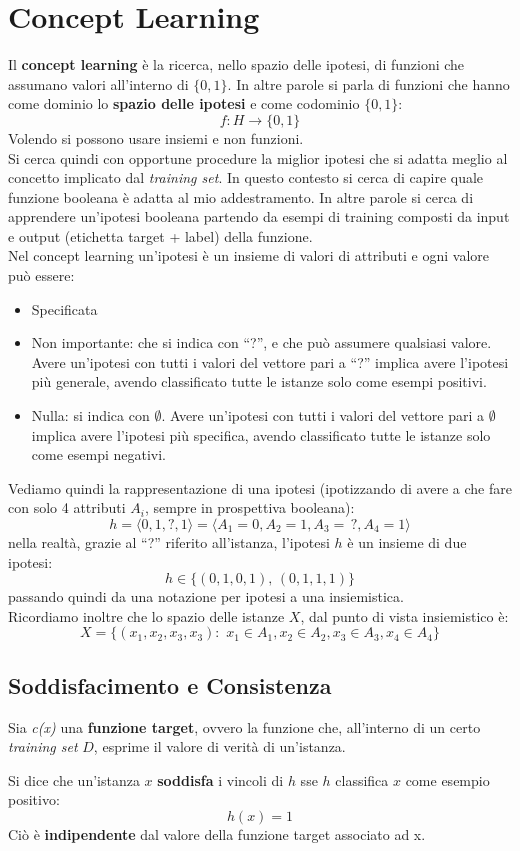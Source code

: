 \chapter{Concept Learning}
\label{Capitolo 2}
Il \textbf{concept learning} è la ricerca, nello spazio delle ipotesi, di
funzioni che assumano valori all'interno di $\{0, 1\}$. In altre parole si
parla di funzioni che hanno come dominio lo \textbf{spazio delle ipotesi} e
come codominio $\{0, 1\}$:
\[f:H\to\{0, 1\}\]
Volendo si possono usare insiemi e non funzioni.\\
Si cerca quindi con opportune procedure la miglior ipotesi che si adatta
meglio al concetto implicato dal \textit{training set}.
In questo contesto si cerca di capire quale funzione booleana è adatta al mio
addestramento. In altre parole si cerca di apprendere un'ipotesi booleana
partendo da esempi di training composti da input e output (etichetta target + label) della
funzione. \\
Nel concept learning un'ipotesi è un insieme di valori di attributi e ogni
valore può essere:
\begin{itemize}
  \item Specificata
  \item Non importante: che si indica con ``?'', e che può assumere qualsiasi
  valore. Avere un'ipotesi con tutti i valori del vettore pari a ``?'' implica
  avere l'ipotesi più generale, avendo classificato tutte le istanze solo come
  esempi positivi. 
  \item Nulla: si indica con $\emptyset$. Avere un'ipotesi con tutti i valori
  del vettore pari a $\emptyset$ implica avere l'ipotesi più specifica, avendo
  classificato tutte le istanze solo come esempi negativi. 
\end{itemize}
\begin{esempio}
  Vediamo quindi la rappresentazione di una ipotesi (ipotizzando di avere a che
  fare con solo 4 attributi $A_i$, sempre in prospettiva booleana):
  \[h=\langle 0, 1, ?, 1\rangle = \langle A_1=0, A_2=1, A_3=\,?, A_4=1\rangle\]
  nella realtà, grazie al ``?'' riferito all'istanza, l'ipotesi $h$ è un insieme
  di due ipotesi: 
  \[h\in\{(0, 1, 0, 1),\,(0, 1, 1, 1)\}\]
  passando quindi da una notazione per ipotesi a una insiemistica.\\
  Ricordiamo inoltre che lo spazio delle istanze $X$, dal punto di vista
  insiemistico è:
  \[X=\{(x_1, x_2, x_3, x_3): \,\, x_1\in A_1, x_2\in A_2, x_3\in A_3, x_4\in A_4\}\]
\end{esempio}
\section{Soddisfacimento e Consistenza}
Sia \textit{c(x)} una \textbf{funzione target}, ovvero la funzione che, all'interno di un certo \textit{training set} $D$, esprime il valore di verità di un'istanza.
\begin{definizione}
Si dice che un'istanza $x$ \textbf{soddisfa} i vincoli di $h$ sse $h$ classifica $x$ come
esempio positivo:
\[h(x)=1\]  
Ciò è \textbf{indipendente} dal valore della funzione target associato ad x.
\end{definizione}


